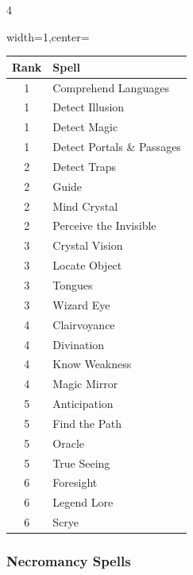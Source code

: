 \documentclass{book}
\begin{document}
\begin{multicols}{4}
\begin{table}[H]
	\begin{adjustbox}{width=1\columnwidth,center=\columnwidth}
		\begin{tabular}{cl}
			\toprule
				Rank & Spell \\
			\midrule
				1 & Comprehend Languages \\
				1 & Detect Illusion \\
				1 & Detect Magic \\
				1 & Detect Portals \& Passages \\
				2 & Detect Traps \\
				2 & Guide \\
				2 & Mind Crystal \\
				2 & Perceive the Invisible \\
				3 & Crystal Vision \\
				3 & Locate Object \\
				3 & Tongues \\
				3 & Wizard Eye \\
				4 & Clairvoyance \\
				4 & Divination \\
				4 & Know Weakness \\
				4 & Magic Mirror \\
				5 & Anticipation \\
				5 & Find the Path \\
				5 & Oracle \\
				5 & True Seeing \\
				6 & Foresight \\
				6 & Legend Lore \\
				6 & Scrye \\
			\bottomrule
		\end{tabular}
	\end{adjustbox}
\end{table}
	
\vfill
\subsubsection*{Necromancy Spells}\label{necromancy-spells}


\end{multicols}
\end{document}
